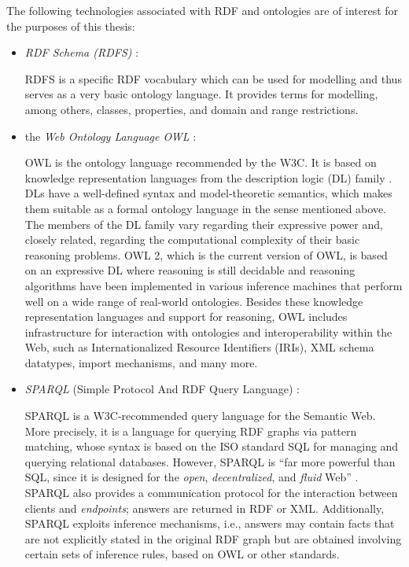 The following technologies associated with RDF and ontologies
are of interest for the purposes of this thesis:
%
\begin{itemize}
  \item
    \emph{RDF Schema (RDFS)} \autocite{RDFS}:
    
    \par
    RDFS is a specific RDF vocabulary which can be used for modelling
    and thus serves as a very basic ontology language.
    It provides terms for modelling, among others, classes, properties, and domain and range restrictions.
  \item
    the \emph{Web Ontology Language OWL} \autocite{OWLPrimer}:
    
    \par
    OWL is the ontology language recommended by the W3C.
    It is based on knowledge representation languages from the description logic (DL) family \autocite{Baader2017}.
    DLs have a well-defined syntax and model-theoretic semantics, which makes them suitable
    as a formal ontology language in the sense mentioned above.
    The members of the DL family vary regarding their expressive power and,
    closely related, regarding the computational complexity of their basic reasoning problems.
    OWL 2, which is the current version of OWL,
    is based on an expressive DL where reasoning is still decidable and reasoning algorithms have been implemented
    in various inference machines that perform well on a wide range of real-world ontologies.
    Besides these knowledge representation languages and support for reasoning,
    OWL includes infrastructure for interaction with ontologies and interoperability
    within the Web, such as Internationalized Resource Identifiers (IRIs),
    XML schema datatypes, import mechanisms, and many more.
  \item
    \emph{SPARQL} (Simple Protocol And RDF Query Language) \autocite{SPARQL}:
    
    \par
    SPARQL is a W3C-recommended query language for the Semantic Web.
    More precisely, it is a language for querying RDF graphs via pattern matching,
    whose syntax is based on the ISO standard SQL \autocite{SQL} for managing and querying relational databases.
    However, SPARQL is \enquote{far more powerful than SQL, since it is designed for the \emph{open}, \emph{decentralized}, and \emph{fluid} Web} \autocite{DellaValle2011}.
    SPARQL also provides a communication protocol for the interaction between clients and \emph{endpoints};
    answers are returned in RDF or XML.
    Additionally, SPARQL exploits inference mechanisms,
    i.e., answers may contain facts that are not explicitly stated in the original RDF graph
    but are obtained involving certain sets of inference rules, based on OWL or other standards.
\end{itemize}

